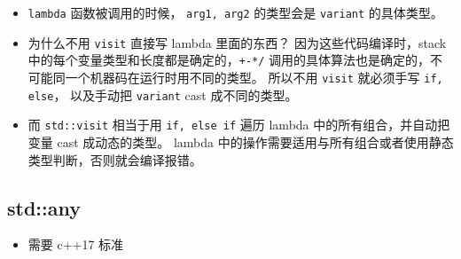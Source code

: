 \begin{itemize}
\item \verb`lambda` 函数被调用的时候， \verb`arg1, arg2` 的类型会是 \verb`variant` 的具体类型。
\item 为什么不用 \verb`visit` 直接写 lambda 里面的东西？ 因为这些代码编译时，stack 中的每个变量类型和长度都是确定的，\verb`+-*/` 调用的具体算法也是确定的，不可能同一个机器码在运行时用不同的类型。 所以不用 \verb`visit` 就必须手写 \verb`if, else`， 以及手动把 \verb`variant` cast 成不同的类型。
\item 而 \verb`std::visit` 相当于用 \verb`if, else if` 遍历 lambda 中的所有组合，并自动把变量 cast 成动态的类型。 lambda 中的操作需要适用与所有组合或者使用静态类型判断，否则就会编译报错。
\end{itemize}

\subsection{std::any}
\begin{itemize}
\item 需要 c++17 标准
\end{itemize}
